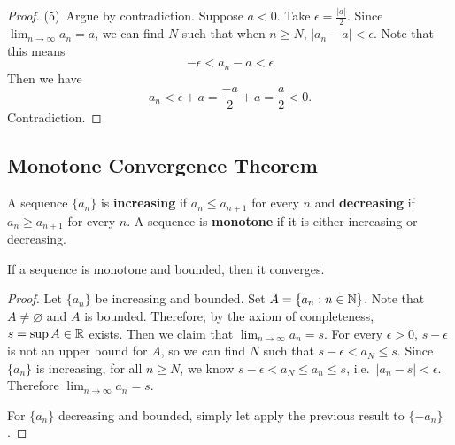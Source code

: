 \begin{proof}
  (5)\, Argue by contradiction. Suppose $a < 0$. Take
  $\epsilon = \frac{|a|}{2}$. Since
  $\lim_{n \to \infty} a_n = a$, we can find $N$ such
  that when $n \ge N$, $|a_n - a| < \epsilon$. Note that
  this means
  \[-\epsilon < a_n - a < \epsilon \]
  Then we have
  \[a_n < \epsilon + a = \frac{-a}{2} + a = \frac{a}{2} < 0.\]
  Contradiction.
\end{proof}

\subsection{Monotone Convergence Theorem}

\begin{definition}
  A sequence $\{a_n\}$ is \textbf{increasing} if
  $a_n \le a_{n + 1}$ for every $n$ and \textbf{decreasing}
  if $a_n \ge a_{n + 1}$ for every $n$. A sequence is
  \textbf{monotone} if it is either increasing or decreasing.
\end{definition}

\begin{theorem}
  If a sequence is monotone and bounded, then it converges.
\end{theorem}

\begin{proof}
  Let $\{a_n\}$ be increasing and bounded. Set
  $A = \{a_n : n \in \mathbb{N}\}$.
  Note that $A \ne \varnothing$ and $A$ is bounded. Therefore, by the
  axiom of completeness, $s = \sup A \in \mathbb{R}$ exists.
  Then we claim that $\lim_{n \to \infty} a_n = s$.
  For
  every $\epsilon > 0$, $s - \epsilon$ is not an upper bound
  for $A$, so we can find $N$ such that
  $s - \epsilon < a_{N} \le s$. 
  Since $\{a_n\}$ is increasing, for all $n \ge N$, we know
  $s - \epsilon < a_N \le a_n \le s$,
  i.e.~$|a_n - s| < \epsilon$. Therefore
  $\lim_{n \to \infty} a_n = s$.

  For $\{a_n\}$ decreasing and bounded, simply let apply the
  previous result to $\{-a_n\}$.
\end{proof}
